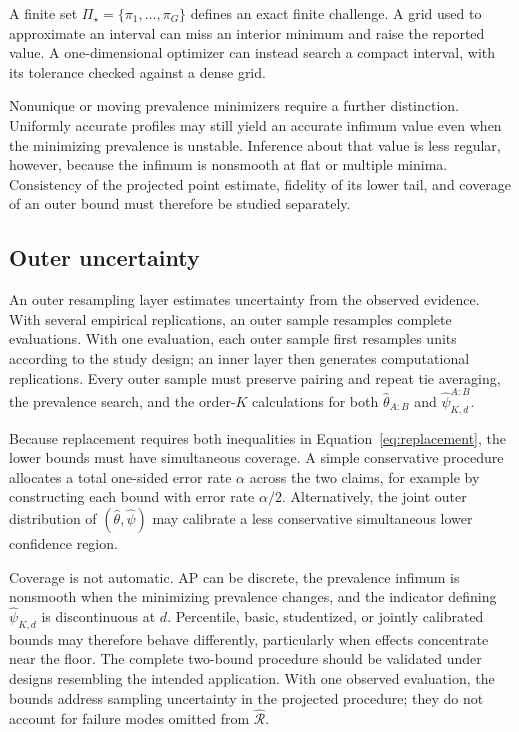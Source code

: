 \documentclass[11pt]{article}
\newcommand{\Regime}{\mathcal{R}}
\newcommand{\PSet}{\Pi_\star}
\theoremstyle{remark}
\begin{document}
A finite set $\PSet=\{\pi_1,\ldots,\pi_G\}$ defines an exact finite challenge. A grid used to approximate an interval can miss an interior minimum and raise the reported value. A one-dimensional optimizer can instead search a compact interval, with its tolerance checked against a dense grid.

Nonunique or moving prevalence minimizers require a further distinction. Uniformly accurate profiles may still yield an accurate infimum value even when the minimizing prevalence is unstable. Inference about that value is less regular, however, because the infimum is nonsmooth at flat or multiple minima. Consistency of the projected point estimate, fidelity of its lower tail, and coverage of an outer bound must therefore be studied separately.

\subsection{Outer uncertainty}

An outer resampling layer estimates uncertainty from the observed evidence. With several empirical replications, an outer sample resamples complete evaluations. With one evaluation, each outer sample first resamples units according to the study design; an inner layer then generates computational replications. Every outer sample must preserve pairing and repeat tie averaging, the prevalence search, and the order-$K$ calculations for both $\widehat\theta_{A:B}$ and $\widehat\psi^{A:B}_{K,d}$.

Because replacement requires both inequalities in Equation~\eqref{eq:replacement}, the lower bounds must have simultaneous coverage. A simple conservative procedure allocates a total one-sided error rate $\alpha$ across the two claims, for example by constructing each bound with error rate $\alpha/2$. Alternatively, the joint outer distribution of $(\widehat\theta,\widehat\psi)$ may calibrate a less conservative simultaneous lower confidence region.

Coverage is not automatic. AP can be discrete, the prevalence infimum is nonsmooth when the minimizing prevalence changes, and the indicator defining $\widehat\psi_{K,d}$ is discontinuous at $d$. Percentile, basic, studentized, or jointly calibrated bounds may therefore behave differently, particularly when effects concentrate near the floor. The complete two-bound procedure should be validated under designs resembling the intended application. With one observed evaluation, the bounds address sampling uncertainty in the projected procedure; they do not account for failure modes omitted from $\widehat{\Regime}$.
\end{document}
